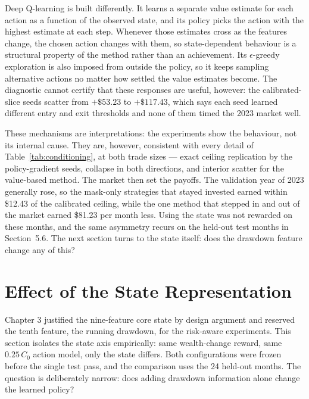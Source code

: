 Deep Q-learning is built differently. It learns a separate value estimate
for each action as a function of the observed state, and its policy picks
the action with the highest estimate at each step. Whenever those
estimates cross as the features change, the chosen action changes with
them, so state-dependent behaviour is a structural property of the method
rather than an achievement. Its $\epsilon$-greedy exploration is also
imposed from outside the policy, so it keeps sampling alternative actions
no matter how settled the value estimates become. The diagnostic cannot
certify that these responses are useful, however: the calibrated-slice
seeds scatter from $+\$53.23$ to $+\$117.43$, which says each seed
learned different entry and exit thresholds and none of them timed the
2023 market well.

These mechanisms are interpretations: the experiments show the behaviour,
not its internal cause. They are, however, consistent with every detail
of Table~\ref{tab:conditioning}, at both trade sizes --- exact ceiling
replication by the policy-gradient seeds, collapse in both directions,
and interior scatter for the value-based method. The market then set the
payoffs. The validation year of 2023 generally rose, so the mask-only
strategies that stayed invested earned within \$12.43 of the calibrated
ceiling, while the one method that stepped in and out of the market
earned \$81.23 per month less. Using the state was not rewarded on these
months, and the same asymmetry recurs on the held-out test months in
Section~5.6. The next section turns to the state itself: does the
drawdown feature change any of this?

\section{Effect of the State Representation}

Chapter 3 justified the nine-feature core state by design argument and
reserved the tenth feature, the running drawdown, for the risk-aware
experiments. This section isolates the state axis empirically: same
wealth-change reward, same $0.25\,C_0$ action model, only the state
differs. Both configurations were frozen before the single test pass, and
the comparison uses the 24 held-out months. The question is deliberately
narrow: does adding drawdown information alone change the learned policy?

